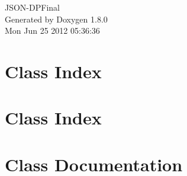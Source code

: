 \documentclass{book}
\begin{document}
\hypersetup{pageanchor=false,citecolor=blue}
\begin{titlepage}
\vspace*{7cm}
\begin{center}
{\Large J\-S\-O\-N-\/\-D\-P\-Final }\\
\vspace*{1cm}
{\large Generated by Doxygen 1.8.0}\\
\vspace*{0.5cm}
{\small Mon Jun 25 2012 05:36:36}\\
\end{center}
\end{titlepage}
\clearemptydoublepage
{}
\tableofcontents
\clearemptydoublepage
{}
\hypersetup{pageanchor=true,citecolor=blue}
\chapter{Class Index}

\chapter{Class Index}

\chapter{Class Documentation}





















\printindex
\end{document}
